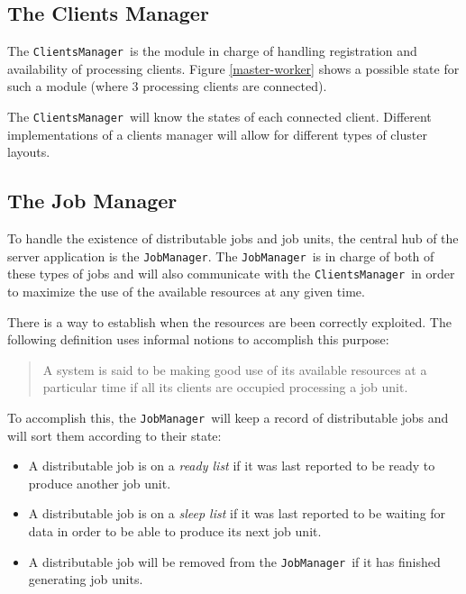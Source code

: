 \documentclass[a4paper,12pt,english]{report}
\newcommand{\JM}{\texttt{JobManager}}
\newcommand{\CM}{\texttt{ClientsManager}}
\begin{document}
\subsection{The Clients Manager}

The \CM \ is the module in charge of handling registration and availability of processing clients. Figure \ref{master-worker} shows a possible state for such a module (where 3 processing clients are connected).

The \CM \ will know the states of each connected client. Different implementations of a clients manager will allow for different types of cluster layouts.

\subsection{The Job Manager}

To handle the existence of distributable jobs and job units, the central hub of the server application is the \JM. The \JM \ is in charge of both of these types of jobs and will also communicate with the \CM \ in order to maximize the use of the available resources at any given time.

There is a way to establish when the resources are been correctly exploited. The following definition uses informal notions to accomplish this purpose:

\begin{quote}
A system is said to be making good use of its available resources at a particular time if all its clients are occupied processing a job unit. 
\end{quote}

To accomplish this, the \JM \ will keep a record of distributable jobs and will sort them according to their state:
\begin{itemize}
 \item A distributable job is on a \emph{ready list} if it was last reported to be ready to produce another job unit.
 \item A distributable job is on a \emph{sleep list} if it was last reported to be waiting for data in order to be able to produce its next job unit.
 \item A distributable job will be removed from the \JM \ if it has finished generating job units.
\end{itemize}
\end{document}
